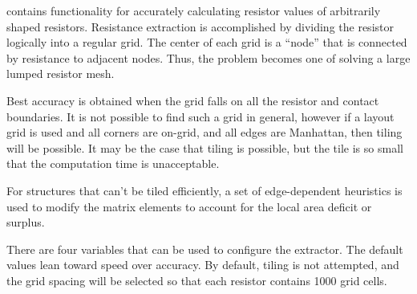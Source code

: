 {\Xic} contains functionality for accurately calculating resistor
values of arbitrarily shaped resistors.  Resistance extraction is
accomplished by dividing the resistor logically into a regular grid. 
The center of each grid is a ``node'' that is connected by resistance
to adjacent nodes.  Thus, the problem becomes one of solving a large
lumped resistor mesh.

Best accuracy is obtained when the grid falls on all the resistor and
contact boundaries.  It is not possible to find such a grid in
general, however if a layout grid is used and all corners are on-grid,
and all edges are Manhattan, then tiling will be possible.  It may be
the case that tiling is possible, but the tile is so small that the
computation time is unacceptable.

For structures that can't be tiled efficiently, a set of
edge-dependent heuristics is used to modify the matrix elements to
account for the local area deficit or surplus.

There are four variables that can be used to configure the extractor. 
The default values lean toward speed over accuracy.  By default,
tiling is not attempted, and the grid spacing will be selected so that
each resistor contains 1000 grid cells.

